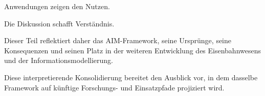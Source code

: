 \begin{summary}
Anwendungen zeigen den Nutzen.

Die Diskussion schafft Verständnis.

Dieser Teil reflektiert daher das AIM-Framework, seine Ursprünge, seine
Konsequenzen und seinen Platz in der weiteren Entwicklung des
Eisenbahnwesens und der Informationsmodellierung.
\end{summary}

Diese interpretierende Konsolidierung bereitet den Ausblick vor, in dem
dasselbe Framework auf künftige Forschungs- und Einsatzpfade projiziert
wird.
